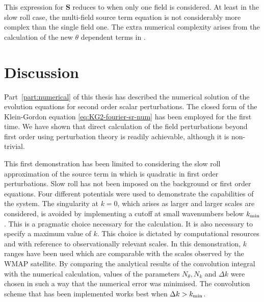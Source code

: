 % 
This expression for $\bm{S}$ reduces to  when only one
field is considered. At least in the slow roll case, the multi-field source term
equation is not considerably more complex than the single field one. The extra
numerical complexity arises from the calculation of the new $\theta$
dependent terms in . 




% 
% 
% 
\section{Discussion}
\label{sec:disc-num}

Part~\ref{part:numerical} of this thesis has described the numerical
solution of the evolution equations for second order scalar perturbations. The
closed form of the Klein-Gordon equation \eqref{eq:KG2-fourier-sr-num} has been
employed for the first time. We have shown that direct
calculation of the field perturbations beyond
first order using perturbation theory is readily achievable, although
it is non-trivial.

This first demonstration has been limited to considering
the slow roll approximation of the source term in  which
is quadratic in first order perturbations. Slow roll has not been imposed on the
background or first order equations. Four different
potentials were
used to demonstrate the capabilities of the
system. The singularity at $k=0$, which arises as larger and larger
scales are considered, is avoided by implementing a cutoff at small
wavenumbers below $k_{\mathrm{min}}$. 
This is a pragmatic choice necessary for
the calculation.
It is also necessary to
specify a maximum value of $k$. This choice is dictated by computational
resources and with reference to observationally relevant scales. In
this demonstration, $k$ ranges have been used which are comparable with the
scales observed by the WMAP satellite. By comparing the analytical results of the
convolution integral with the numerical calculation, values of the parameters
$N_\theta, N_k$ and $\Delta k$ were chosen in such a way that the numerical error
was minimised. The convolution scheme that has been implemented
works best when $\Delta k>k_{\mathrm{min}}$.


